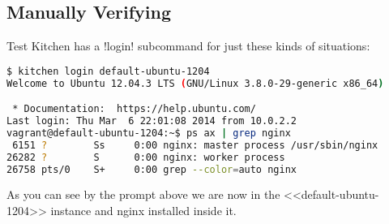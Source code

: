 \subsection{Manually Verifying}

Test Kitchen has a \inline!login! subcommand for just these kinds of situations:

\begin{lstlisting}[language=Bash,label=lst:testing-test-kitchen12]
$ kitchen login default-ubuntu-1204
Welcome to Ubuntu 12.04.3 LTS (GNU/Linux 3.8.0-29-generic x86_64)

 * Documentation:  https://help.ubuntu.com/
Last login: Thu Mar  6 22:01:08 2014 from 10.0.2.2
vagrant@default-ubuntu-1204:~$ ps ax | grep nginx
 6151 ?        Ss     0:00 nginx: master process /usr/sbin/nginx
26282 ?        S      0:00 nginx: worker process
26758 pts/0    S+     0:00 grep --color=auto nginx
\end{lstlisting}

As you can see by the prompt above we are now in the <<default-ubuntu-1204>> instance and nginx installed inside it.